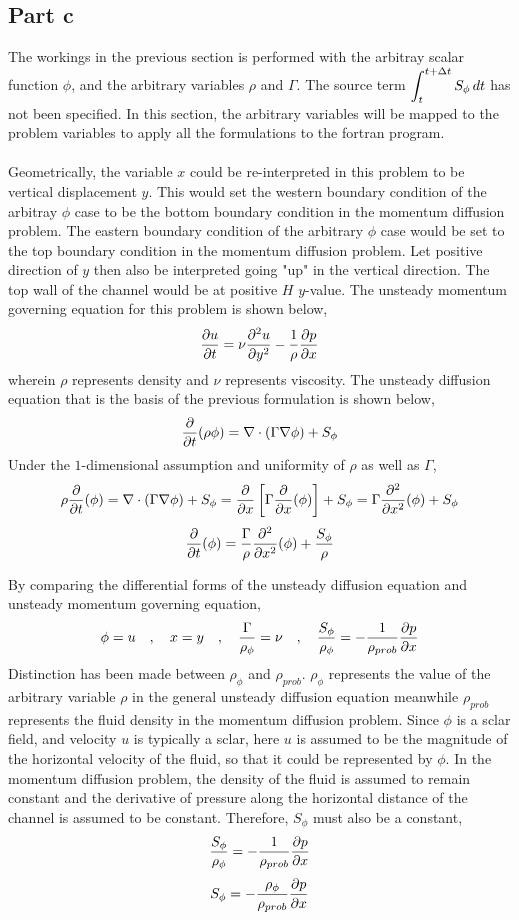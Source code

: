 \documentclass[a4paper, 12pt]{report}
\begin{document}
\begin{center}
\subsection{Part c}
The workings in the previous section is performed with the arbitray scalar function $\phi$, and the arbitrary variables $\rho$ and $\Gamma$. The source term $\displaystyle{\int^{t+\Delta t}_{t} S_\phi\,dt}$ has not been specified. In this section, the arbitrary variables will be mapped to the problem variables to apply all the formulations to the fortran program.
\\~\\Geometrically, the variable $x$ could be re-interpreted in this problem to be vertical displacement $y$. This would set the western boundary condition of the arbitray $\phi$ case to be the bottom boundary condition in the momentum diffusion problem. The eastern boundary condition of the arbitrary $\phi$ case would be set to the top boundary condition in the momentum diffusion problem. Let positive direction of $y$ then also be interpreted going "up" in the vertical direction. The top wall of the channel would be at positive $H$ $y$-value. The unsteady momentum governing equation for this problem is shown below,
$$\frac{\partial u}{\partial t} = \nu\frac{\partial^2 u}{\partial y^2} -\frac{1}{\rho}\frac{\partial p}{\partial x}$$
wherein $\rho$ represents density and $\nu$ represents viscosity. The unsteady diffusion equation that is the basis of the previous formulation is shown below,
$$\frac{\partial}{\partial t}(\rho \phi) = \nabla\cdot(\Gamma \nabla\phi) + S_\phi$$
Under the $1$-dimensional assumption and uniformity of $\rho$ as well as $\Gamma$,
$$\rho\frac{\partial}{\partial t}(\phi) = \nabla\cdot(\Gamma \nabla\phi) + S_\phi = \frac{\partial}{\partial x}\left[\Gamma \frac{\partial}{\partial x}(\phi)\right] + S_\phi = \Gamma \frac{\partial^2}{\partial x^2}(\phi) + S_\phi$$
$$\frac{\partial}{\partial t}(\phi) = \frac{\Gamma}{\rho} \frac{\partial^2}{\partial x^2}(\phi) + \frac{S_\phi}{\rho}$$

By comparing the differential forms of the unsteady diffusion equation and unsteady momentum governing equation,
$$\phi = u \quad,\quad x = y \quad,\quad \frac{\Gamma}{\rho_\phi} = \nu \quad,\quad \frac{S_\phi}{\rho_\phi} = -\frac{1}{\rho_{prob}}\frac{\partial p}{\partial x}$$
Distinction has been made between $\rho_{\phi}$ and $\rho_{prob}$. $\rho_\phi$ represents the value of the arbitrary variable $\rho$ in the general unsteady diffusion equation meanwhile $\rho_{prob}$ represents the fluid density in the momentum diffusion problem. Since $\phi$ is a sclar field, and velocity $u$ is typically a sclar, here $u$ is assumed to be the magnitude of the horizontal velocity of the fluid, so that it could be represented by $\phi$. In the momentum diffusion problem, the density of the fluid is assumed to remain constant and the derivative of pressure along the horizontal distance of the channel is assumed to be constant. Therefore, $S_\phi$ must also be a constant,
$$\frac{S_\phi}{\rho_\phi} = -\frac{1}{\rho_{prob}}\frac{\partial p}{\partial x}$$
$$S_\phi = -\frac{\rho_\phi}{\rho_{prob}}\frac{\partial p}{\partial x}$$


\end{center}
\end{document}
